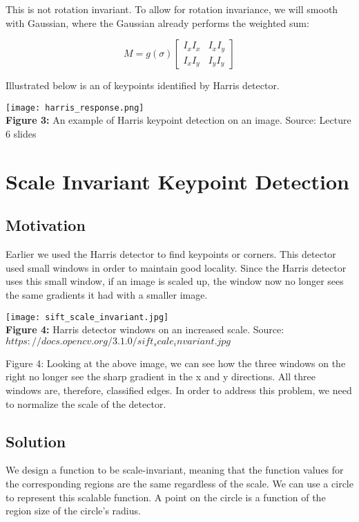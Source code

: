 \documentclass{article}
\begin{document}
This is not rotation invariant. To allow for rotation invariance, we will smooth with Gaussian, where the Gaussian already performs the weighted sum:

\[M =
g( \sigma )
  \begin{bmatrix}
      I_x I_x & I_x I_y\\
      I_x I_y & I_y I_y
    \end{bmatrix}
\]

Illustrated below is an of keypoints identified by Harris detector.
\begin{center}
	\texttt{[image: harris\_response.png]}\\
    \textbf{Figure 3:} An example of Harris keypoint detection on an image. Source: Lecture 6 slides \\
\end{center}

\section{Scale Invariant Keypoint Detection}
\subsection{Motivation}
Earlier we used the Harris detector to find keypoints or corners. This detector used small windows in order to maintain good locality. Since the Harris detector uses this small window, if an image is scaled up, the window now no longer sees the same gradients it had with a smaller image.\\
\begin{center}
	\texttt{[image: sift\_scale\_invariant.jpg]} \\
    \textbf{Figure 4:} Harris detector windows on an increased scale. Source: $https://docs.opencv.org/3.1.0/sift_scale_invariant.jpg$
\end{center}
Figure 4:
Looking at the above image, we can see how the three windows on the right no longer see the sharp gradient in the x and y directions. All three windows are, therefore, classified edges. In order to address this problem, we need to normalize the scale of the detector.
\subsection{Solution}
We design a function to be scale-invariant, meaning that the function values for the corresponding regions are the same regardless of the scale. We can use a circle to represent this scalable function. A point on the circle is a function of the region size of the circle's radius.
\end{document}
